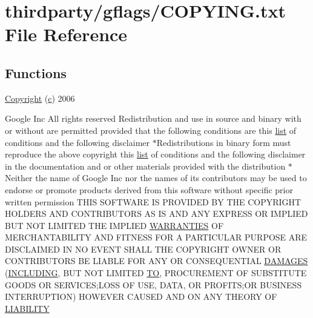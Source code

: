 \hypertarget{COPYING_8txt}{}\section{thirdparty/gflags/\+C\+O\+P\+Y\+I\+NG.txt File Reference}
\label{COPYING_8txt}
\subsection*{Functions}
\begin{DoxyCompactItemize}
\item 
\hyperlink{COPYING_8txt_a66a39a542d136928346c1b46f9acd1aa}{Copyright} (\hyperlink{CMakeCache_8txt_aac1d6a1710812201527c735f7c6afbaa}{c}) 2006
\item 
Google Inc All rights reserved Redistribution and use in source and binary with or without are permitted provided that the following conditions are this \hyperlink{CMakeLists_8txt_a548e427ae9357a6f3536cff3ca23efda}{list} of conditions and the following disclaimer $\ast$Redistributions in binary form must reproduce the above copyright this \hyperlink{CMakeLists_8txt_a548e427ae9357a6f3536cff3ca23efda}{list} of conditions and the following disclaimer in the documentation and or other materials provided with the distribution $\ast$Neither the name of Google Inc nor the names of its contributors may be used to endorse or promote products derived from this software without specific prior written permission T\+H\+IS S\+O\+F\+T\+W\+A\+RE IS P\+R\+O\+V\+I\+D\+ED BY T\+HE C\+O\+P\+Y\+R\+I\+G\+HT H\+O\+L\+D\+E\+RS A\+ND C\+O\+N\+T\+R\+I\+B\+U\+T\+O\+RS AS IS A\+ND A\+NY E\+X\+P\+R\+E\+SS OR I\+M\+P\+L\+I\+ED B\+UT N\+OT L\+I\+M\+I\+T\+ED T\+HE I\+M\+P\+L\+I\+ED \hyperlink{COPYING_8txt_ac62ff2f8b2f565a26b35ecca12f17f4a}{W\+A\+R\+R\+A\+N\+T\+I\+ES} OF M\+E\+R\+C\+H\+A\+N\+T\+A\+B\+I\+L\+I\+TY A\+ND F\+I\+T\+N\+E\+SS F\+OR A P\+A\+R\+T\+I\+C\+U\+L\+AR P\+U\+R\+P\+O\+SE A\+RE D\+I\+S\+C\+L\+A\+I\+M\+ED IN NO E\+V\+E\+NT S\+H\+A\+LL T\+HE C\+O\+P\+Y\+R\+I\+G\+HT O\+W\+N\+ER OR C\+O\+N\+T\+R\+I\+B\+U\+T\+O\+RS BE L\+I\+A\+B\+LE F\+OR A\+NY OR C\+O\+N\+S\+E\+Q\+U\+E\+N\+T\+I\+AL \hyperlink{COPYING_8txt_a411bac22211234ac5298e4174e95237d}{D\+A\+M\+A\+G\+ES} (\hyperlink{COPYING_8txt_ab1928ef22d7c2011aca3b1e59ca80596}{I\+N\+C\+L\+U\+D\+I\+NG}, B\+UT N\+OT L\+I\+M\+I\+T\+ED \hyperlink{COPYING_8txt_a4b42230e232228783545c1173b0ac51d}{TO}, P\+R\+O\+C\+U\+R\+E\+M\+E\+NT OF S\+U\+B\+S\+T\+I\+T\+U\+TE G\+O\+O\+DS OR S\+E\+R\+V\+I\+C\+ES;L\+O\+SS OF U\+SE, D\+A\+TA, OR P\+R\+O\+F\+I\+TS;OR B\+U\+S\+I\+N\+E\+SS I\+N\+T\+E\+R\+R\+U\+P\+T\+I\+ON) H\+O\+W\+E\+V\+ER C\+A\+U\+S\+ED A\+ND ON A\+NY T\+H\+E\+O\+RY OF \hyperlink{COPYING_8txt_a44320ff734839f8d00a0bf9c461148da}{L\+I\+A\+B\+I\+L\+I\+TY}

\end{DoxyCompactItemize}
